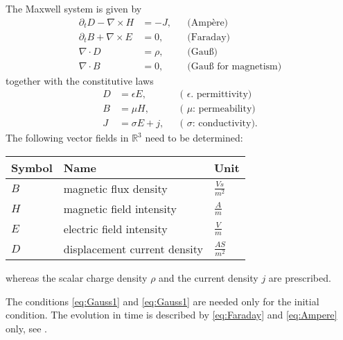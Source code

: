 \documentclass[a4paper,12pt]{article}
\theoremstyle{definition}
\theoremstyle{definition}
\begin{document}
The Maxwell system is given by
\begin{subequations}
\begin{align}
\partial_t D - \nabla\times H &= -J, &&\text{(Ampère)} \label{eq:Ampere}\\
\partial_t B + \nabla\times E &= 0, &&\text{(Faraday)} \label{eq:Faraday}\\
\nabla\cdot D &= \rho, &&\text{(Gauß)} \label{eq:Gauss1}\\
\nabla\cdot B &=0, &&\text{(Gauß for magnetism)} \label{eq:Gauss2}
\end{align}
\end{subequations}
together with the constitutive laws
\begin{subequations}
\begin{align}
D &= \epsilon E, &&\text{( $\epsilon$. permittivity)}\\
B &= \mu H, &&\text{( $\mu$: permeability)}\\
J &= \sigma E + j, &&\text{( $\sigma$: conductivity)} .
\end{align}
\end{subequations}
The following vector fields in $\mathbb{R}^3$ need to be determined:
\begin{center}
\begin{tabular}{lll}
Symbol & Name & Unit\\
\hline
$B$ & magnetic flux density & $\frac{Vs}{m^2}$\\
$H$ & magnetic field intensity & $\frac{A}{m}$\\
$E$ & electric field intensity & $\frac{V}{m}$\\
$D$ & displacement current density & $\frac{AS}{m^2}$\\
\hline
\end{tabular}
\end{center}
whereas the scalar charge density $\rho$ and the current density $j$ are prescribed.

The conditions \eqref{eq:Gauss1} and \eqref{eq:Gauss1} are needed only for the
initial condition. The evolution in time is described by \eqref{eq:Faraday} and
\eqref{eq:Ampere} only, see \cite{JinBook}.
\end{document}
